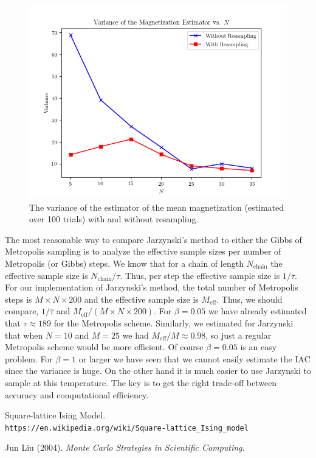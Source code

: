 \documentclass[11pt,a4paper]{amsart}
\begin{document}
\begin{figure}[H]
\centering
\includegraphics[width=5in]{varvsN.png}
\caption{The variance of the estimator of the mean magnetization (estimated over 100 trials) with and without resampling.}
\label{fig:varvsN}
\end{figure}

\par The most reasonable way to compare Jarzynski's method to either the Gibbs of Metropolis sampling is to analyze the effective sample sizes per number of Metropolis (or Gibbs) steps.  We know that for a chain of length $N_{\text{chain}}$ the effective sample size is $N_{\text{chain}}/\tau$.  Thus, per step the effective sample size is $1/\tau$.  For our implementation of Jarzynski's method, the total number of Metropolis steps is $M \times N \times 200$ and the effective sample size is $M_{\text{eff}}$.  Thus, we should compare, $1/\hat{\tau}$ and $M_{\text{eff}}/(M\times N \times 200)$.  For $\beta = 0.05$ we have already estimated that $\tau \approx 189$ for the Metropolis scheme.  Similarly, we estimated for Jarzynski that when $N=10$ and $M=25$ we had $M_{\text{eff}}/M \approx 0.98$, so just a regular Metropolis scheme would be more efficient.  Of course $\beta = 0.05$ is an easy problem.  For $\beta = 1$ or larger we have seen that we cannot easily estimate the IAC since the variance is huge.  On the other hand it is much easier to use Jarzynski to sample at this temperature.  The key is to get the right trade-off between accuracy and computational efficiency.






\begin{thebibliography}{10}

Square-lattice Ising Model.\\
\texttt{https://en.wikipedia.org/wiki/Square-lattice\_Ising\_model}

\vspace{0.1in}

Jun Liu (2004). \emph{Monte Carlo Strategies in Scientific Computing}.

\end{thebibliography}

\end{document}
